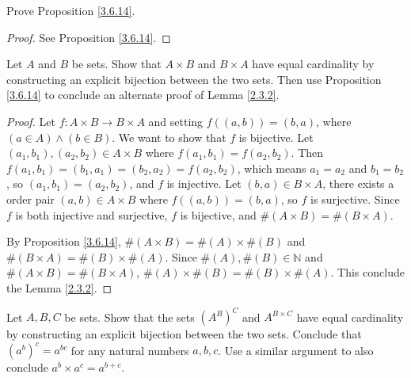 \begin{exercise}\label{ex 3.6.4}
Prove Proposition \ref{3.6.14}.
\end{exercise}

\begin{proof}
See Proposition \ref{3.6.14}.
\end{proof}

\begin{exercise}\label{ex 3.6.5}
Let \(A\) and \(B\) be sets.
Show that \(A \times B\) and \(B \times A\) have equal cardinality by constructing an explicit bijection between the two sets.
Then use Proposition \ref{3.6.14} to conclude an alternate proof of Lemma \ref{2.3.2}.
\end{exercise}

\begin{proof}
Let \(f : A \times B \to B \times A\) and setting \(f((a, b)) = (b, a)\), where \((a \in A) \land (b \in B)\).
We want to show that \(f\) is bijective.
Let \((a_1, b_1), (a_2, b_2) \in A \times B\) where \(f(a_1, b_1) = f(a_2, b_2)\).
Then \(f(a_1, b_1) = (b_1, a_1) = (b_2, a_2) = f(a_2, b_2)\), which means \(a_1 = a_2\) and \(b_1 = b_2\), so \((a_1, b_1) = (a_2, b_2)\), and \(f\) is injective.
Let \((b, a) \in B \times A\), there exists a order pair \((a, b) \in A \times B\) where \(f((a, b)) = (b, a)\), so \(f\) is surjective.
Since \(f\) is both injective and surjective, \(f\) is bijective, and \(\#(A \times B) = \#(B \times A)\).

By Proposition \ref{3.6.14}, \(\#(A \times B) = \#(A) \times \#(B)\) and \(\#(B \times A) = \#(B) \times \#(A)\).
Since \(\#(A), \#(B) \in \mathds{N}\) and \(\#(A \times B) = \#(B \times A)\), \(\#(A) \times \#(B) = \#(B) \times \#(A)\).
This conclude the Lemma \ref{2.3.2}.
\end{proof}

\begin{exercise}\label{ex 3.6.6}
Let \(A, B, C\) be sets.
Show that the sets \((A^B)^C\) and \(A^{B \times C}\) have equal cardinality by constructing an explicit bijection between the two sets.
Conclude that \((a^b)^c = a^{bc}\) for any natural numbers \(a, b, c\).
Use a similar argument to also conclude \(a^b \times a^c = a^{b+c}\).
\end{exercise}


